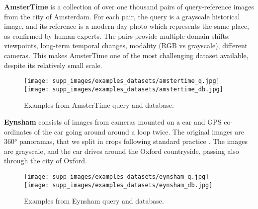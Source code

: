 \documentclass[10pt,twocolumn,letterpaper]{article}
\newcommand{\myparagraph}[1]{\vspace{4pt}\noindent\textbf{#1}}
\begin{document}
\myparagraph{AmsterTime} \cite{Yildiz_2022_AmsterTime}
is a collection of over one thousand pairs of query-reference images from the city of Amsterdam.
For each pair, the query is a grayscale historical image, and its reference is a modern-day photo which represents the same place, as confirmed by human experts.
The pairs provide multiple domain shifts: viewpoints, long-term temporal changes, modality (RGB vs grayscale), different cameras.
This makes AmsterTime one of the most challenging dataset available, despite its relatively small scale.
\vspace{-0.3cm}
\begin{figure}[H]
    \begin{center}
    \texttt{[image: supp\_images/examples\_datasets/amstertime\_q.jpg]}
    \texttt{[image: supp\_images/examples\_datasets/amstertime\_db.jpg]}
    \end{center}
    \vspace{-0.6cm}
    \caption{Examples from AmsterTime query and database.}
\end{figure}
\vspace{-0.3cm}

\myparagraph{Eynsham} \cite{Cummins_2009_eynsham}
consists of images from cameras mounted on a car and GPS co-ordinates of the car going around around a loop twice.
The original images are 360° panoramas, that we split in crops following standard practice \cite{Torii_2015_pitts250k, Torii_2018_tokyo247, Berton_2022_benchmark}.
The images are grayscale, and the car drives around the Oxford countryside, passing also through the city of Oxford.
\vspace{-0.3cm}
\begin{figure}[H]
    \begin{center}
    \texttt{[image: supp\_images/examples\_datasets/eynsham\_q.jpg]}
    \texttt{[image: supp\_images/examples\_datasets/eynsham\_db.jpg]}
    \end{center}
    \vspace{-0.6cm}
    \caption{Examples from Eynsham query and database.}
\end{figure}
\vspace{-0.3cm}
\end{document}

